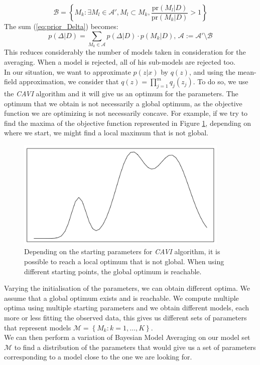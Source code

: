 \begin{equation}
\mathcal{B} = \left\lbrace M_k : \exists M_l \in \mathcal{A}', M_l \subset M_k, \frac{\text{pr}(M_l|D)}{\text{pr}(M_k|D)}> 1 \right\rbrace
\label{eq:occam_2}
\end{equation} 
The sum (\ref{eq:prior_Delta}) becomes:
\begin{equation}
p(\Delta|D) = \sum_{M_k \in \mathcal{A}}p(\Delta|D)\cdot p(M_k|D)\text{, }\mathcal{A} := \mathcal{A}'\setminus\mathcal{B}
\label{eq:occam_3}
\end{equation}
This reduces considerably the number of models taken in consideration for the averaging. When a model is rejected, all of his sub-models are rejected too.\\
\newline
In our situation, we want to approximate $p(z|x)$ by $q(z)$, and using the mean-field approximation, we consider that $q(z) = \prod_{j=1}^m q_j(z_j)$. To do so, we use the \textit{CAVI} algorithm and it will give us an optimum for the parameters. The optimum that we obtain is not necessarily a global optimum, as the objective function we are optimizing is not necessarily concave. For example, if we try to find the maxima of the objective function represented in Figure \ref{fig:localOptimum}, depending on where we start, we might find a local maximum that is not global.\\
\newline
\begin{figure}[h!]
\includegraphics[width=4in]{images/localOptimum.png}
\caption{\label{fig:localOptimum}Depending on the starting parameters for \textit{CAVI} algorithm, it is possible to reach a local optimum that is not global. When using different starting points, the global optimum is reachable.}
\end{figure}
Varying the initialisation of the parameters, we can obtain different optima. We assume that a global optimum exists and is reachable. We compute multiple optima using multiple starting parameters and we obtain different models, each more or less fitting the observed data, this gives us different sets of parameters that represent models $\mathcal{M} = \left\lbrace M_k : k=1, \dots, K\right\rbrace$. \\
\newline
We can then perform a variation of Bayesian Model Averaging on our model set $\mathcal{M}$ to find a distribution of the parameters that would give us a set of parameters corresponding to a model close to the one we are looking for.